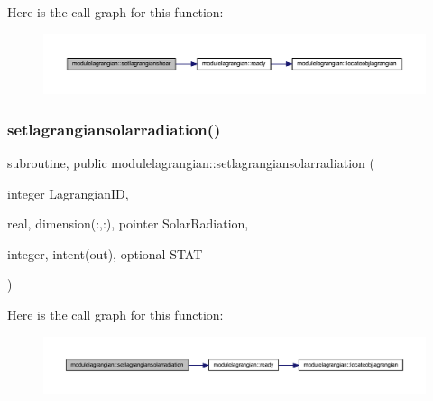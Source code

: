 Here is the call graph for this function\+:\nopagebreak
\begin{figure}[H]
\begin{center}
\leavevmode
\includegraphics[width=350pt]{namespacemodulelagrangian_ab0d8db7a7c4e175fc509a8c3e6e6efab_cgraph}
\end{center}
\end{figure}
\mbox{\label{namespacemodulelagrangian_a26def3f84c8200513c53ea500f051cdd}} 
\subsubsection{\texorpdfstring{setlagrangiansolarradiation()}{setlagrangiansolarradiation()}}
{\footnotesize\ttfamily subroutine, public modulelagrangian\+::setlagrangiansolarradiation (\begin{DoxyParamCaption}\item[{integer}]{Lagrangian\+ID,  }\item[{real, dimension(\+:,\+:), pointer}]{Solar\+Radiation,  }\item[{integer, intent(out), optional}]{S\+T\+AT }\end{DoxyParamCaption})}

Here is the call graph for this function\+:\nopagebreak
\begin{figure}[H]
\begin{center}
\leavevmode
\includegraphics[width=350pt]{namespacemodulelagrangian_a26def3f84c8200513c53ea500f051cdd_cgraph}
\end{center}
\end{figure}
\mbox{\label{namespacemodulelagrangian_ab06dca3c92c46b6fb4d05e0c79c7fbd6}} 

